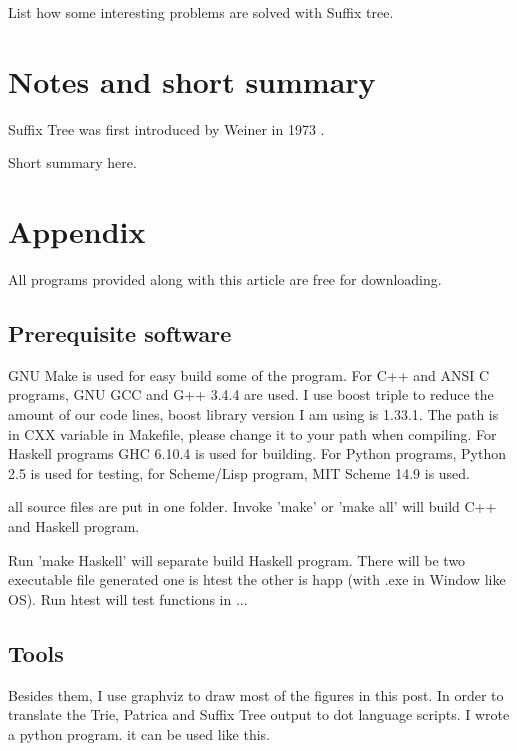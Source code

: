 \documentclass{article}
\begin{document}
List how some interesting problems are solved with Suffix tree.

\section{Notes and short summary}

Suffix Tree was first introduced by Weiner in 1973 \cite{weiner}.

Short summary here.

\section{Appendix} \label{appendix}
All programs provided along with this article are free for
downloading.

\subsection{Prerequisite software}
GNU Make is used for easy build some of the program. For C++ and ANSI C programs,
GNU GCC and G++ 3.4.4 are used. I use boost triple to reduce the
amount of our code lines, boost library version I am using is
1.33.1. The path is in CXX variable in Makefile, please change it to
your path when compiling.
For Haskell programs GHC 6.10.4 is used
for building. For Python programs, Python 2.5 is used for testing, for
Scheme/Lisp program, MIT Scheme 14.9 is used.

all source files are put in one folder. Invoke 'make' or 'make all'
will build C++ and Haskell program. 

Run 'make Haskell' will separate build Haskell program. There will be
two executable file generated one is htest the other is happ (with .exe
in Window like OS). Run htest will test functions in ...

\subsection{Tools}

Besides them, I use graphviz to draw most of the figures in this post. In order to
translate the Trie, Patrica and Suffix Tree output to dot language scripts. I wrote a python program.
it can be used like this.
\end{document}
